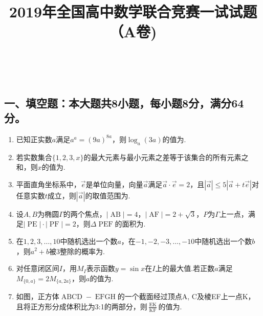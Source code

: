 \documentclass[UTF8]{ctexart}\usepackage{amsmath,amssymb,graphicx}
\newcommand{\tmop}[1]{\ensuremath{\operatorname{#1}}}
\begin{document}
\

\title{2019年全国高中数学联合竞赛一试试题（A卷)}

\maketitle

\subsection*{一、填空题：本大题共8小题，每小题8分，满分64分。}

\begin{enumerate}
  \item 已知正实数$a$满足$a^a = (9 a)^{8 a}$，则$\log_a (3
  a)$的值为{\underline{{\hspace{3em}}}}.
  
  \item 若实数集合$\{ 1, 2, 3, x
  \}$的最大元素与最小元素之差等于该集合的所有元素之和，则$x$的值为{\underline{{\hspace{3em}}}}.
  
  \item
  平面直角坐标系中，$\vec{e}$是单位向量，向量$\vec{a}$满足$\vec{a}
  \cdot \vec{e} = 2$，且$| \vec{a} | \leqslant 5 | \vec{a} + t \vec{e}
  |$对任意实数$t$成立，则$| \vec{a}
  |$的取值范围为{\underline{{\hspace{3em}}}}.
  
  \item 设$A, B$为椭圆$\Gamma$的两个焦点，$| \tmop{AB} | = 4$，$|
  \tmop{AF} | = 2 + \sqrt{3}$，$P$为$\Gamma$上一点，满足$| \tmop{PE} |
  \cdot | \tmop{PF} | = 2$，则$\Delta
  \tmop{PEF}$的面积为{\underline{{\hspace{3em}}}}.
  
  \item 在$1, 2, 3, \ldots, 10$中随机选出一个数$a$，在$- 1, - 2, -
  3, \ldots, - 10$中随机选出一个数$b$，则$a^2 +
  b$被3整除的概率为{\underline{{\hspace{3em}}}}.
  
  \item 对任意闭区间$I$，用$M_I$表示函数$y = \sin
  x$在$I$上的最大值.若正数$a$满足$M_{\{ 0, a \}} = 2 M_{\{ a, 2 a
  \}}$，则$a$的值为{\underline{{\hspace{3em}}}}.
  
  \item 如图，正方体$\tmop{ABCD} -
  \tmop{EFGH}$的一个截面经过顶点A,
  C及棱EF上一点K，且将正方形分成体积比为3:1的两部分，则$\frac{\tmop{EK}}{\tmop{KF}}$的值为{\underline{{\hspace{3em}}}}.
  

\end{enumerate}
\end{document}
